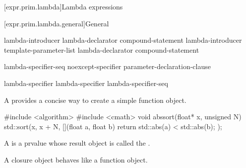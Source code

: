 [expr.prim.lambda]{Lambda expressions}%

[expr.prim.lambda.general]{General}%

\begin{bnf}
\br
    lambda-introducer  lambda-declarator compound-statement\br
    lambda-introducer \terminal{<} template-parameter-list \terminal{>}  \br
    \bnfindent lambda-declarator compound-statement
\end{bnf}

\begin{bnf}
\br
    \terminal{[}  \terminal{]}
\end{bnf}

\begin{bnf}
\br
    lambda-specifier-seq   \br
    noexcept-specifier  \br
    \br
    \terminal{(} parameter-declaration-clause \terminal{)}   \br
    \bnfindent {} 
\end{bnf}

\begin{bnf}
\br
    \br
    \br
    \br
\end{bnf}

\begin{bnf}
\br
    lambda-specifier\br
    lambda-specifier lambda-specifier-seq
\end{bnf}

\pnum
A  provides
a concise way to create a simple function object.
\begin{example}
\begin{codeblock}
#include <algorithm>
#include <cmath>
void abssort(float* x, unsigned N) {
  std::sort(x, x + N, [](float a, float b) { return std::abs(a) < std::abs(b); });
}
\end{codeblock}
\end{example}

\pnum
A  is a prvalue
whose result object is called the .
\begin{note}
A closure object behaves like a function
object.
\end{note}

